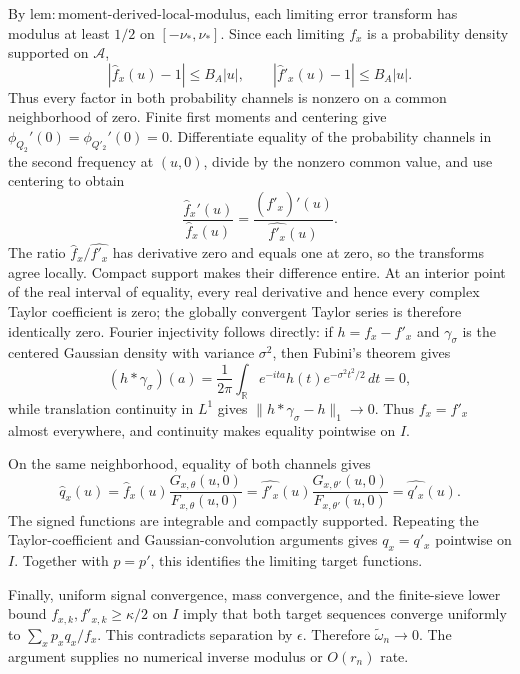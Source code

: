 By \(\mathrm{lem{:}moment\text{-}derived\text{-}local\text{-}modulus}\), each limiting error transform has modulus at least \(1/2\) on \([-\nu_*,\nu_*]\). Since each limiting \(f_x\) is a probability density supported on \(\mathcal A\),
\[
 |\widehat f_x(u)-1|\le B_A|u|,
 \qquad |\widehat f'_x(u)-1|\le B_A|u|.
\]
Thus every factor in both probability channels is nonzero on a common neighborhood of zero. Finite first moments and centering give \(\phi_{Q_2}'(0)=\phi_{Q'_2}'(0)=0\). Differentiate equality of the probability channels in the second frequency at \((u,0)\), divide by the nonzero common value, and use centering to obtain
\[
 \frac{\widehat f_x'(u)}{\widehat f_x(u)}
 =\frac{(\widehat{f'_x})'(u)}{\widehat{f'_x}(u)}.
\]
The ratio \(\widehat f_x/\widehat{f'_x}\) has derivative zero and equals one at zero, so the transforms agree locally. Compact support makes their difference entire. At an interior point of the real interval of equality, every real derivative and hence every complex Taylor coefficient is zero; the globally convergent Taylor series is therefore identically zero. Fourier injectivity follows directly: if \(h=f_x-f'_x\) and \(\gamma_\sigma\) is the centered Gaussian density with variance \(\sigma^2\), then Fubini's theorem gives
\[
 (h*\gamma_\sigma)(a)=\frac1{2\pi}\int_{\mathbb R}
 e^{-ita}\widehat h(t)e^{-\sigma^2t^2/2}\,dt=0,
\]
while translation continuity in \(L^1\) gives \(\|h*\gamma_\sigma-h\|_1\to0\). Thus \(f_x=f'_x\) almost everywhere, and continuity makes equality pointwise on \(I\).

On the same neighborhood, equality of both channels gives
\[
 \widehat q_x(u)
 =\widehat f_x(u)\frac{G_{x,\theta}(u,0)}{F_{x,\theta}(u,0)}
 =\widehat{f'_x}(u)\frac{G_{x,\theta'}(u,0)}{F_{x,\theta'}(u,0)}
 =\widehat{q'_x}(u).
\]
The signed functions are integrable and compactly supported. Repeating the Taylor-coefficient and Gaussian-convolution arguments gives \(q_x=q'_x\) pointwise on \(I\). Together with \(p=p'\), this identifies the limiting target functions.

Finally, uniform signal convergence, mass convergence, and the finite-sieve lower bound \(f_{x,k},f'_{x,k}\ge\kappa/2\) on \(I\) imply that both target sequences converge uniformly to \(\sum_xp_xq_x/f_x\). This contradicts separation by \(\epsilon\). Therefore \(\widetilde\omega_n\to0\). The argument supplies no numerical inverse modulus or \(O(r_n)\) rate.

